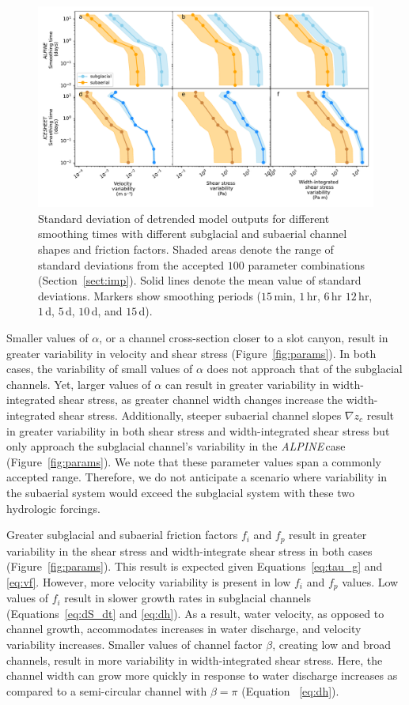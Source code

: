 \documentclass[tc, manuscript]{copernicus}
\newcommand{\alpine}{\textit{ALPINE}\,}
\begin{document}
\begin{figure}[hbt!]
  \centering
  \includegraphics[width=0.7\linewidth]{Fig3.pdf}
  \caption{Standard deviation of detrended model outputs for different smoothing times with different subglacial and subaerial channel shapes and friction factors.
    Shaded areas denote the range of standard deviations from the accepted $100$ parameter combinations (Section~\ref{sect:imp}).
    Solid lines denote the mean value of standard deviations.
    Markers show smoothing periods ($15$\,\unit{min}, $1$\,\unit{hr}, $6$\,\unit{hr} $12$\,\unit{hr}, $1$\,\unit{d}, $5$\,\unit{d}, $10$\,\unit{d}, and $15$\,\unit{d}).
  }
  \label{fig:multi_run}
\end{figure}

Smaller values of $\alpha$, or a channel cross-section closer to a slot canyon, result in greater variability in velocity and shear stress (Figure~\ref{fig:params}).
In both cases, the variability of small values of $\alpha$ does not approach that of the subglacial channels.
Yet, larger values of $\alpha$ can result in greater variability in width-integrated shear stress, as greater channel width changes increase the width-integrated shear stress.
Additionally, steeper subaerial channel slopes $\nabla z_c$ result in greater variability in both shear stress and width-integrated shear stress but only approach the subglacial channel's variability in the \alpine case (Figure~\ref{fig:params}). 
We note that these parameter values span a commonly accepted range.
Therefore, we do not anticipate a scenario where variability in the subaerial system would exceed the subglacial system with these two hydrologic forcings.

Greater subglacial and subaerial friction factors $f_i$ and $f_p$ result in greater variability in the shear stress and width-integrate shear stress in both cases (Figure~\ref{fig:params}).
This result is expected given Equations~\ref{eq:tau_g} and \ref{eq:vf}.
However, more velocity variability is present in low  $f_i$ and $f_p$ values. 
Low values of $f_i$ result in slower growth rates in subglacial channels (Equations~\ref{eq:dS_dt} and \ref{eq:dh}).
As a result, water velocity, as opposed to channel growth, accommodates increases in water discharge, and velocity variability increases.
Smaller values of channel factor $\beta$, creating low and broad channels, result in more variability in width-integrated shear stress.
Here, the channel width can grow more quickly in response to water discharge increases as compared to a semi-circular channel with $\beta = \pi$ (Equation~ \ref{eq:dh}).
\end{document}
